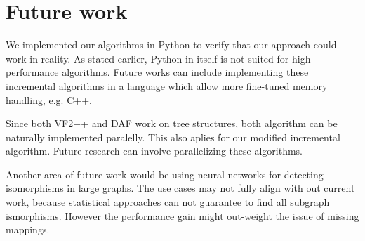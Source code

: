\chapter{Future work}

We implemented our algorithms in Python to verify that our approach could work in reality. As stated earlier,
Python in itself is not suited for high performance algorithms. Future works can include implementing these
incremental algorithms in a language which allow more fine-tuned memory handling, e.g. C++.

Since both VF2++ and DAF work on tree structures, both algorithm can be naturally implemented paralelly. This
also aplies for our modified incremental algorithm. Future research can involve parallelizing these algorithms.

Another area of future work would be using neural networks for detecting isomorphisms in large graphs. The use 
cases may not fully align with out current work, because statistical approaches can not guarantee to find all
subgraph ismorphisms. However the performance gain might out-weight the issue of missing mappings.